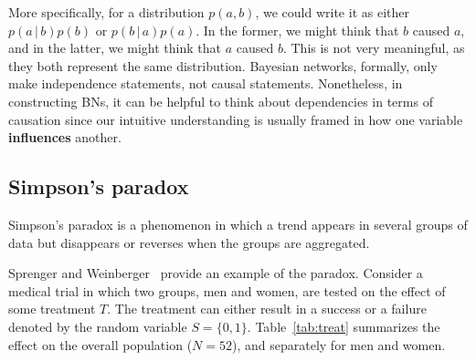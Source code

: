 \documentclass{article}
\newcommand{\giv}{\,|\,}
\begin{document}
More specifically, for a distribution $p(a, b)$, we could write it as either $p(a \giv b)p(b)$ or $p(b \giv a)p(a)$. In the former, we might think that $b$ caused $a$, and in the latter, we might think that $a$ caused $b$. This is not very meaningful, as they both represent the same distribution. Bayesian networks, formally, only make independence statements, not causal statements. Nonetheless, in constructing BNs, it can be helpful to think about dependencies in terms of causation since our intuitive understanding is usually framed in how one variable \textbf{influences} another.   

\subsection{Simpson's paradox}

Simpson's paradox is a phenomenon in which a trend appears in several groups of data but disappears or reverses when the groups are aggregated. 

Sprenger and Weinberger~\cite{paradox-simpson} provide an example of the paradox. Consider a medical trial in which two groups, men and women, are tested on the effect of some treatment $T$. The treatment can either result in a success or a failure denoted by the random variable $S = \{0, 1\}$. Table~\ref{tab:treat} summarizes the effect on the overall population ($N=52$), and separately for men and women. 

\begin{table}[H]
    \centering
    \caption{Simpson's paradox in which the association at the population level (positive, negative, independent) changes at the level of subpopulations.}\label{tab:treat}
    \vspace{5mm}
\end{table}
\end{document}
